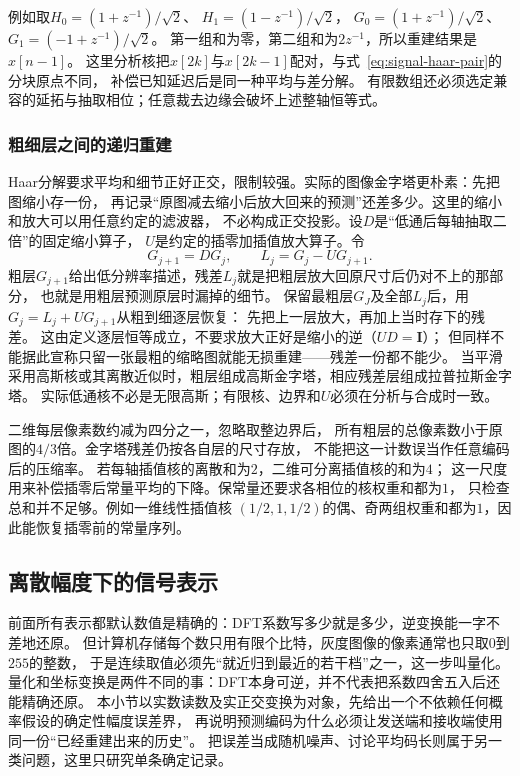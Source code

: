 例如取$H_0=(1+z^{-1})/\sqrt2$、
$H_1=(1-z^{-1})/\sqrt2$，
$G_0=(1+z^{-1})/\sqrt2$、
$G_1=(-1+z^{-1})/\sqrt2$。
第一组和为零，第二组和为$2z^{-1}$，所以重建结果是$x[n-1]$。
这里分析核把$x[2k]$与$x[2k-1]$配对，与式~\eqref{eq:signal-haar-pair}的分块原点不同，
补偿已知延迟后是同一种平均与差分解。
有限数组还必须选定兼容的延拓与抽取相位；任意裁去边缘会破坏上述整轴恒等式。

\subsubsection{粗细层之间的递归重建}
\label{sec:signal-pyramid-reconstruction}
Haar分解要求平均和细节正好正交，限制较强。实际的图像金字塔更朴素：先把图缩小存一份，
再记录“原图减去缩小后放大回来的预测”还差多少。这里的缩小和放大可以用任意约定的滤波器，
不必构成正交投影。设$D$是“低通后每轴抽取二倍”的固定缩小算子，
$U$是约定的插零加插值放大算子。令
\begin{equation}
 G_{j+1}=DG_j,\qquad L_j=G_j-UG_{j+1}.
 \label{eq:signal-laplacian-pyramid}
\end{equation}
粗层$G_{j+1}$给出低分辨率描述，残差$L_j$就是把粗层放大回原尺寸后仍对不上的那部分，
也就是用粗层预测原层时漏掉的细节。
保留最粗层$G_J$及全部$L_j$后，用$G_j=L_j+UG_{j+1}$从粗到细逐层恢复：
先把上一层放大，再加上当时存下的残差。
这由定义逐层恒等成立，不要求放大正好是缩小的逆（$UD=\bm I$）；
但同样不能据此宣称只留一张最粗的缩略图就能无损重建——残差一份都不能少。
当平滑采用高斯核或其离散近似时，粗层组成高斯金字塔，相应残差层组成拉普拉斯金字塔。
实际低通核不必是无限高斯；有限核、边界和$U$必须在分析与合成时一致。

二维每层像素数约减为四分之一，忽略取整边界后，
所有粗层的总像素数小于原图的$4/3$倍。金字塔残差仍按各自层的尺寸存放，
不能把这一计数误当作任意编码后的压缩率。
若每轴插值核的离散和为$2$，二维可分离插值核的和为$4$；
这一尺度用来补偿插零后常量平均的下降。保常量还要求各相位的核权重和都为$1$，
只检查总和并不足够。例如一维线性插值核
$(1/2,1,1/2)$的偶、奇两组权重和都为$1$，因此能恢复插零前的常量序列。

\subsection{离散幅度下的信号表示}
\label{sec:signal-quantized-representation}

前面所有表示都默认数值是精确的：DFT系数写多少就是多少，逆变换能一字不差地还原。
但计算机存储每个数只用有限个比特，灰度图像的像素通常也只取$0$到$255$的整数，
于是连续取值必须先“就近归到最近的若干档”之一，这一步叫量化。
量化和坐标变换是两件不同的事：DFT本身可逆，并不代表把系数四舍五入后还能精确还原。
本小节以实数读数及实正交变换为对象，先给出一个不依赖任何概率假设的确定性幅度误差界，
再说明预测编码为什么必须让发送端和接收端使用同一份“已经重建出来的历史”。
把误差当成随机噪声、讨论平均码长则属于另一类问题，这里只研究单条确定记录。

